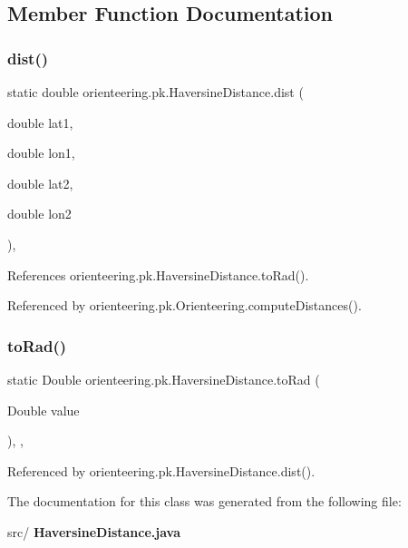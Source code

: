 \subsection{Member Function Documentation}
\mbox{\label{classorienteering_1_1pk_1_1HaversineDistance_a60b5cb0ee086f309af093e054dde300f}} 
\subsubsection{dist()}
{\footnotesize\ttfamily static double orienteering.\+pk.\+Haversine\+Distance.\+dist (\begin{DoxyParamCaption}\item[{double}]{lat1,  }\item[{double}]{lon1,  }\item[{double}]{lat2,  }\item[{double}]{lon2 }\end{DoxyParamCaption})\hspace{0.3cm}{\ttfamily [inline]}, {\ttfamily [static]}}



References orienteering.\+pk.\+Haversine\+Distance.\+to\+Rad().



Referenced by orienteering.\+pk.\+Orienteering.\+compute\+Distances().

\mbox{\label{classorienteering_1_1pk_1_1HaversineDistance_a7e850e2fc6c49dec5dc1c36c2e9dff75}} 
\subsubsection{to\+Rad()}
{\footnotesize\ttfamily static Double orienteering.\+pk.\+Haversine\+Distance.\+to\+Rad (\begin{DoxyParamCaption}\item[{Double}]{value }\end{DoxyParamCaption})\hspace{0.3cm}{\ttfamily [inline]}, {\ttfamily [static]}, {\ttfamily [private]}}



Referenced by orienteering.\+pk.\+Haversine\+Distance.\+dist().



The documentation for this class was generated from the following file\+:\begin{DoxyCompactItemize}
\item 
src/\textbf{ Haversine\+Distance.\+java}\end{DoxyCompactItemize}
